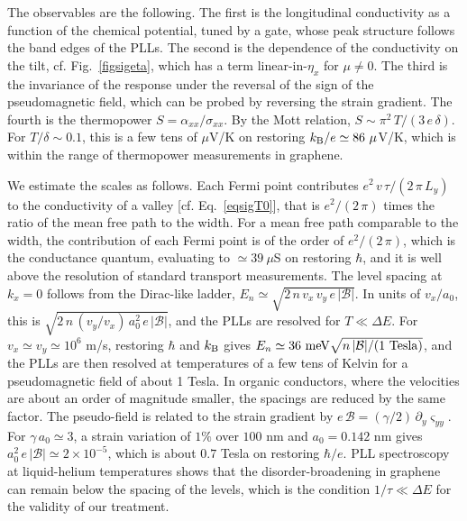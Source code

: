 \documentclass[aps,prb, onecolumn, nofootinbib, citeautoscript,10pt]{revtex4-2}
\begin{document}
The observables are the following. The first is the longitudinal conductivity as a function of the chemical potential, tuned by a gate, whose peak structure follows the band edges of the PLLs. The second is the dependence of the conductivity on the tilt, cf. Fig.~\ref{figsigeta}, which has a term linear-in-$\eta_x$ for $\mu\neq 0$. The third is the invariance of the response under the reversal of the sign of the pseudomagnetic field, which can be probed by reversing the strain gradient. The fourth is the thermopower $S=\alpha_{xx}/\sigma_{xx}$. By the Mott relation, $S\sim\pi^2\,T/(3\,e\,\delta)$. For $T/\delta\sim0.1$, this is a few tens of $\mu$V/K on restoring $k_{\rm B}/e\simeq86\ \mu$V/K, which is within the range of thermopower measurements in graphene.

We estimate the scales as follows. Each Fermi point contributes $e^2\,v\,\tau/(2\,\pi\,L_y)$ to the conductivity of a valley [cf. Eq.~\eqref{eqsigT0}], that is $e^2/(2\,\pi)$ times the ratio of the mean free path to the width. For a mean free path comparable to the width, the contribution of each Fermi point is of the order of $e^2/(2\,\pi)$, which is the conductance quantum, evaluating to $\simeq 39\ \mu$S on restoring $\hbar$, and it is well above the resolution of standard transport measurements. The level spacing at $k_x=0$ follows from the Dirac-like ladder, $E_n\simeq\sqrt{2\,n\,v_x\,v_y\,e\,|\mathcal B|}$. In units of $v_x/a_0$, this is $\sqrt{2\,n\,(v_y/v_x)\,a_0^2\,e\,|\mathcal B|}$, and the PLLs are resolved for $T\ll\Delta E$. For $v_x\simeq v_y\simeq10^6$ m/s, restoring $\hbar$ and $k_{\rm B}$ gives $E_n\simeq36\ {\rm meV}\sqrt{n\,|\mathcal B|/(1\ {\rm Tesla})}$, and the PLLs are then resolved at temperatures of a few tens of Kelvin for a pseudomagnetic field of about 1 Tesla. In organic conductors, where the velocities are about an order of magnitude smaller, the spacings are reduced by the same factor. The pseudo-field is related to the strain gradient by $e\,\mathcal B=(\gamma/2)\,\partial_y\varsigma_{yy}$. For $\gamma\,a_0\simeq3$, a strain variation of $1\%$ over $100$ nm and $a_0=0.142$ nm gives $a_0^2\,e\,|\mathcal B|\simeq2\times10^{-5}$, which is about $0.7$ Tesla on restoring $\hbar/e$. PLL spectroscopy at liquid-helium temperatures \cite{levy10} shows that the disorder-broadening in graphene can remain below the spacing of the levels, which is the condition $1/\tau\ll\Delta E$ for the validity of our treatment.
\end{document}
